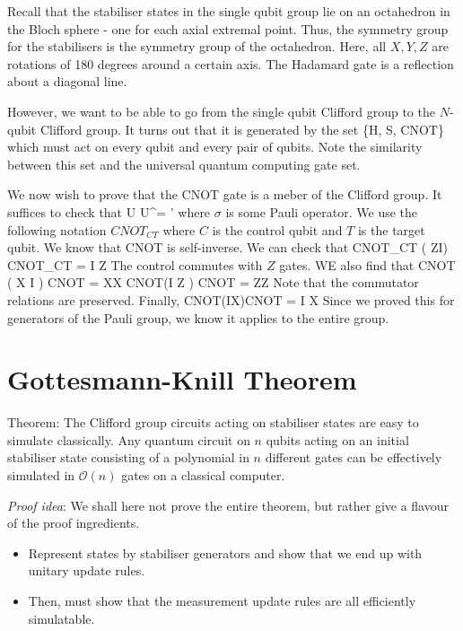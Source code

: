 Recall that the stabiliser states in the single qubit group lie on an octahedron in the Bloch sphere - one for each axial extremal point. Thus, the symmetry group for the stabilisers is the symmetry group of the octahedron. Here, all $X,Y,Z$ are rotations of 180 degrees around a certain axis. The Hadamard gate is a reflection about a diagonal line. 

However, we want to be able to go from the single qubit Clifford group to the $N$-qubit Clifford group. It turns out that it is generated by the set
\beq
\{H, S, CNOT\}
\eeq
which must act on every qubit and every pair of qubits. Note the similarity between this set and the universal quantum computing gate set. 

We now wish to prove that the CNOT gate is a meber of the Clifford group. It suffices to check that 
\beq
U \sigma U^\dagger = \sigma' 
\eeq
where $\sigma$ is some Pauli operator. We use the following notation $CNOT_{CT}$ where $C$ is the control qubit and $T$ is the target qubit. We know that CNOT is self-inverse. We can check that 
\beq
CNOT_{CT} ( Z\otimes I) CNOT_{CT} = I \otimes Z
\eeq
The control commutes with $Z$ gates. WE also find that 
\beq
CNOT ( X \otimes I ) CNOT = X\otimes X
\eeq
\beq
CNOT(I \otimes Z ) CNOT = Z\otimes Z
\eeq
Note that the commutator relations are preserved. Finally, 
\beq
CNOT(I\otimes X)CNOT = I \otimes X
\eeq
Since we proved this for generators of the Pauli group, we know it applies to the entire group. 

\section{Gottesmann-Knill Theorem}
Theorem: The Clifford group circuits acting on stabiliser states are easy to simulate classically. Any quantum circuit on $n$ qubits acting on an initial stabiliser state consisting of a polynomial in $n$ different gates can be effectively simulated in $\mathcal{O}(n)$ gates on a classical computer. 

\emph{Proof idea}: We shall here not prove the entire theorem, but rather give a flavour of the proof ingredients. 
\begin{itemize}
\item Represent states by stabiliser generators and show that we end up with unitary update rules. 
\item Then, must show that the measurement update rules are all efficiently simulatable. 
\end{itemize}

